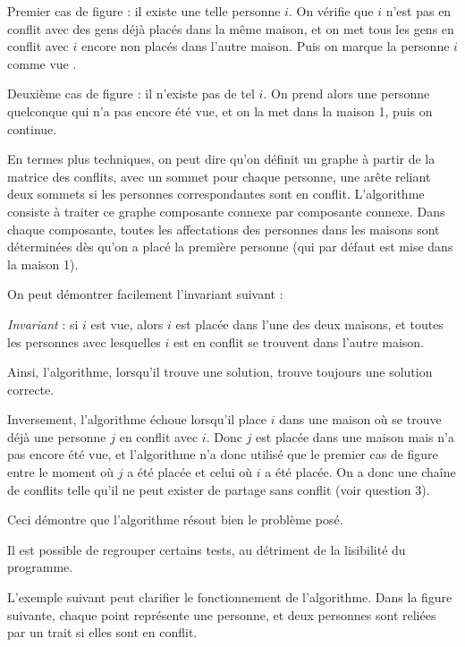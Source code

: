 Premier cas de figure : il existe une telle personne $i$. On vérifie que $i$ n'est pas en conflit avec des gens déjà placés dans la même maison, et on met tous les gens en conflit avec $i$ encore non placés dans l'autre maison. Puis on marque la personne $i$ comme \og vue \fg{}.
\medskip

Deuxième cas de figure : il n'existe pas de tel $i$. On prend alors une personne quelconque qui n'a pas encore été vue, et on la met dans la maison 1, puis on continue.
\medskip

En termes plus techniques, on peut dire qu'on définit un graphe à partir de la matrice des conflits, avec un sommet pour chaque personne, une arête reliant deux sommets si les personnes correspondantes sont en conflit. L'algorithme consiste à traiter ce graphe composante connexe par composante connexe. Dans chaque composante, toutes les affectations des personnes dans les maisons sont déterminées dès qu'on a placé la première personne (qui par défaut est mise dans la maison 1).
\medskip

On peut démontrer facilement l'invariant suivant :
\medskip

\textit{Invariant} : si $i$ est vue, alors $i$ est placée dans l'une des deux maisons, et toutes les personnes avec lesquelles $i$ est en conflit se trouvent dans l'autre maison.
\medskip

Ainsi, l'algorithme, lorsqu'il trouve une solution, trouve toujours une solution correcte.
\medskip

Inversement, l'algorithme échoue lorsqu'il place $i$ dans une maison où se trouve déjà une personne $j$ en conflit avec $i$. Donc $j$ est placée dans une maison mais n'a pas encore été vue, et l'algorithme n'a donc utilisé que le premier cas de figure entre le moment où $j$ a été placée et celui où $i$ a été placée. On a donc une chaîne de conflits telle qu'il ne peut exister de partage sans conflit (voir question 3).
\medskip

Ceci démontre que l'algorithme résout bien le problème posé.



Il est possible de regrouper certains tests, au détriment de la lisibilité du programme.
\medskip

L'exemple suivant peut clarifier le fonctionnement de l'algorithme. Dans la figure suivante, chaque point représente une personne, et deux personnes sont reliées par un trait si elles sont en conflit.
\medskip

